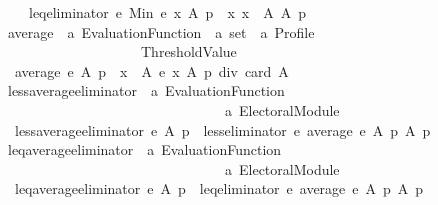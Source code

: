 \begin{isabellebody}
\ \ \ \ leq{\isacharunderscore}{\kern0pt}eliminator\ e\ {\isacharparenleft}{\kern0pt}Min\ {\isacharbraceleft}{\kern0pt}e\ x\ A\ p\ {\isacharbar}{\kern0pt}\ x{\isachardot}{\kern0pt}\ x\ {\isasymin}\ A{\isacharbraceright}{\kern0pt}{\isacharparenright}{\kern0pt}\ A\ p{\isachardoublequoteclose}\isanewline
\isanewline
{}\isamarkupfalse%
\ average\ {\isacharcolon}{\kern0pt}{\isacharcolon}{\kern0pt}\ {\isachardoublequoteopen}{\isacharprime}{\kern0pt}a\ Evaluation{\isacharunderscore}{\kern0pt}Function\ {\isasymRightarrow}\ {\isacharprime}{\kern0pt}a\ set\ {\isasymRightarrow}\ {\isacharprime}{\kern0pt}a\ Profile\ {\isasymRightarrow}\isanewline
\ \ \ \ \ \ \ \ \ \ \ \ \ \ \ \ \ \ \ \ Threshold{\isacharunderscore}{\kern0pt}Value{\isachardoublequoteclose}\ \isanewline
\ \ {\isachardoublequoteopen}average\ e\ A\ p\ {\isacharequal}{\kern0pt}\ {\isacharparenleft}{\kern0pt}{\isasymSum}x\ {\isasymin}\ A{\isachardot}{\kern0pt}\ e\ x\ A\ p{\isacharparenright}{\kern0pt}\ div\ {\isacharparenleft}{\kern0pt}card\ A{\isacharparenright}{\kern0pt}{\isachardoublequoteclose}\isanewline
\isanewline
{}\isamarkupfalse%
\ less{\isacharunderscore}{\kern0pt}average{\isacharunderscore}{\kern0pt}eliminator\ {\isacharcolon}{\kern0pt}{\isacharcolon}{\kern0pt}\ {\isachardoublequoteopen}{\isacharprime}{\kern0pt}a\ Evaluation{\isacharunderscore}{\kern0pt}Function\ {\isasymRightarrow}\isanewline
\ \ \ \ \ \ \ \ \ \ \ \ \ \ \ \ \ \ \ \ \ \ \ \ \ \ \ \ \ \ \ \ {\isacharprime}{\kern0pt}a\ Electoral{\isacharunderscore}{\kern0pt}Module{\isachardoublequoteclose}\ \isanewline
\ \ {\isachardoublequoteopen}less{\isacharunderscore}{\kern0pt}average{\isacharunderscore}{\kern0pt}eliminator\ e\ A\ p\ {\isacharequal}{\kern0pt}\ less{\isacharunderscore}{\kern0pt}eliminator\ e\ {\isacharparenleft}{\kern0pt}average\ e\ A\ p{\isacharparenright}{\kern0pt}\ A\ p{\isachardoublequoteclose}\isanewline
\isanewline
{}\isamarkupfalse%
\ leq{\isacharunderscore}{\kern0pt}average{\isacharunderscore}{\kern0pt}eliminator\ {\isacharcolon}{\kern0pt}{\isacharcolon}{\kern0pt}\ {\isachardoublequoteopen}{\isacharprime}{\kern0pt}a\ Evaluation{\isacharunderscore}{\kern0pt}Function\ {\isasymRightarrow}\isanewline
\ \ \ \ \ \ \ \ \ \ \ \ \ \ \ \ \ \ \ \ \ \ \ \ \ \ \ \ \ \ \ \ {\isacharprime}{\kern0pt}a\ Electoral{\isacharunderscore}{\kern0pt}Module{\isachardoublequoteclose}\ \isanewline
\ \ {\isachardoublequoteopen}leq{\isacharunderscore}{\kern0pt}average{\isacharunderscore}{\kern0pt}eliminator\ e\ A\ p\ {\isacharequal}{\kern0pt}\ leq{\isacharunderscore}{\kern0pt}eliminator\ e\ {\isacharparenleft}{\kern0pt}average\ e\ A\ p{\isacharparenright}{\kern0pt}\ A\ p{\isachardoublequoteclose}%

\end{isabellebody}
